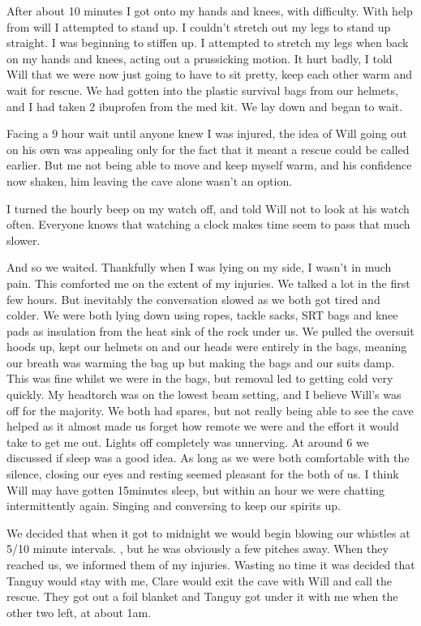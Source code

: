     After about 10 minutes I got onto my hands and knees, with difficulty. With help from will I attempted to stand up. I couldn't stretch out my legs to stand up straight. I was beginning to stiffen up. I attempted to stretch my legs when back on my hands and knees, acting out a prussicking motion. It hurt badly, I told Will that we were now just going to have to sit pretty, keep each other warm and wait for rescue. We had gotten into the plastic survival bags from our helmets, and I had taken 2 ibuprofen from the med kit. We lay down and began to wait.

    Facing a 9 hour wait until anyone knew I was injured, the idea of Will going out on his own was appealing only for the fact that it meant a rescue could be called earlier. But me not being able to move and keep myself warm, and his confidence now shaken, him leaving the cave alone wasn't an option.

    I turned the hourly beep on my watch off, and told Will not to look at his watch often. Everyone knows that watching a clock makes time seem to pass that much slower.


                    
                    
    And so we waited. Thankfully when I was lying on my side, I wasn't in much pain. This comforted me on the extent of my injuries. We talked a lot in the first few hours. But inevitably the conversation slowed as we both got tired and colder. We were both lying down using ropes, tackle sacks, SRT bags and knee pads as insulation from the heat sink of the rock under us. We pulled the oversuit hoods up, kept our helmets on and our heads were entirely in the bags, meaning our breath was warming the bag up but making the bags and our suits damp. This was fine whilst we were in the bags, but removal led to getting cold very quickly. My headtorch was on the lowest beam setting, and I believe Will's was off for the majority. We both had spares, but not really being able to see the cave helped as it almost made us forget how remote we were and the effort it would take to get me out. Lights off completely was unnerving. At around 6 we discussed if sleep was a good idea. As long as we were both comfortable with the silence, closing our eyes and resting seemed pleasant for the both of us. I think Will may have gotten 15minutes sleep, but within an hour we were chatting intermittently again. Singing and conversing to keep our spirits up.

    We decided that when it got to midnight we would begin blowing our whistles at 5/10 minute intervals. , but he was obviously a few pitches away. When they reached us, we informed them of my injuries. Wasting no time it was decided that Tanguy would stay with me, Clare would exit the cave with Will and call the rescue. They got out a foil blanket and Tanguy got under it with me when the other two left, at about 1am.
    
